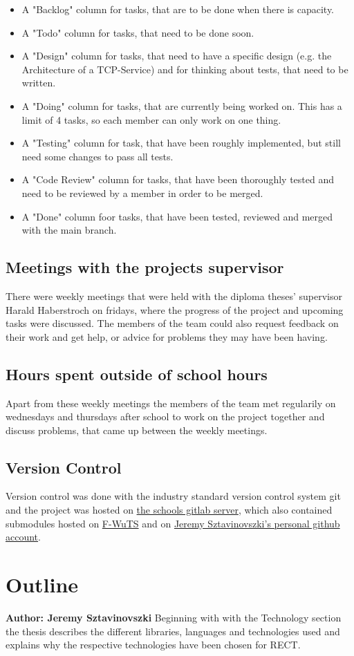 \begin{itemize}
\item A "Backlog" column for tasks, that are to be done when there is capacity.
\item A "Todo" column for tasks, that need to be done soon.
\item A "Design" column for tasks, that need to have a specific design (e.g. the Architecture of a TCP-Service) and for thinking about tests, that need to be written.
\item A "Doing" column for tasks, that are currently being worked on. This has a limit of 4 tasks, so each member can only work on one thing.
\item A "Testing" column for task, that have been roughly implemented, but still need some changes to pass all tests.
\item A "Code Review" column for tasks, that have been thoroughly tested and need to be reviewed by a member in order to be merged.
\item A "Done" column foor tasks, that have been tested, reviewed and merged with the main branch.
\end{itemize}

\subsection{Meetings with the projects supervisor}
There were weekly meetings that were held with the diploma theses' supervisor Harald Haberstroch on fridays, where the progress of the project and upcoming tasks were discussed.
The members of the team could also request feedback on their work and get help, or advice for problems they may have been having.

\subsection{Hours spent outside of school hours} 
Apart from these weekly meetings the members of the team met regularily on wednesdays and thursdays after school to work on the project together and discuss problems, 
that came up between the weekly meetings.

\subsection{Version Control}
Version control was done with the industry standard version control system git and the project was hosted on \href{https://gitlab.htlwrn.ac.at/Sztavinovszki.Jeremy/RECT}{the schools gitlab server}, 
which also contained submodules hosted on \href{https://github.com/F-WuTS/}{F-WuTS} and on \href{https://github.com/if-loop69420}{Jeremy Sztavinovszki's personal github account}.

\section{Outline}
\textbf{Author: Jeremy Sztavinovszki}
Beginning with with the Technology section the thesis describes the different libraries, languages and technologies used and explains why the respective technologies have been chosen for RECT.


\filbreak
